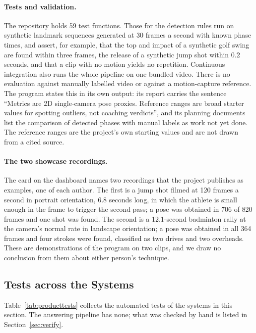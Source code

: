 \documentclass[sigconf,nonacm]{acmart}
\begin{document}
\paragraph{Tests and validation.}
The repository holds 59 test functions. Those for the detection rules run on synthetic
landmark sequences generated at 30 frames a second with known phase times, and assert, for
example, that the top and impact of a synthetic golf swing are found within three frames, the
release of a synthetic jump shot within 0.2 seconds, and that a clip with no motion yields no
repetition. Continuous integration also runs the whole pipeline on one bundled video. There is
no evaluation against manually labelled video or against a motion-capture reference. The
program states this in its own output: its report carries the sentence ``Metrics are 2D
single-camera pose proxies. Reference ranges are broad starter values for spotting outliers,
not coaching verdicts'', and its planning documents list the comparison of detected phases
with manual labels as work not yet done. The reference ranges are the project's own starting
values and are not drawn from a cited source.

\paragraph{The two showcase recordings.}
The card on the dashboard names two recordings that the project publishes as examples, one of
each author. The first is a jump shot filmed at 120 frames a second in portrait orientation,
6.8 seconds long, in which the athlete is small enough in the frame to trigger the second
pass; a pose was obtained in 706 of 820 frames and one shot was found. The second is a
12.1-second badminton rally at the camera's normal rate in landscape orientation; a pose was
obtained in all 364 frames and four strokes were found, classified as two drives and two
overheads. These are demonstrations of the program on two clips, and we draw no conclusion
from them about either person's technique.

\subsection{Tests across the Systems}\label{sec:producttests}
Table~\ref{tab:producttests} collects the automated tests of the systems in this section. The
answering pipeline has none; what was checked by hand is listed in Section~\ref{sec:verify}.
\end{document}

